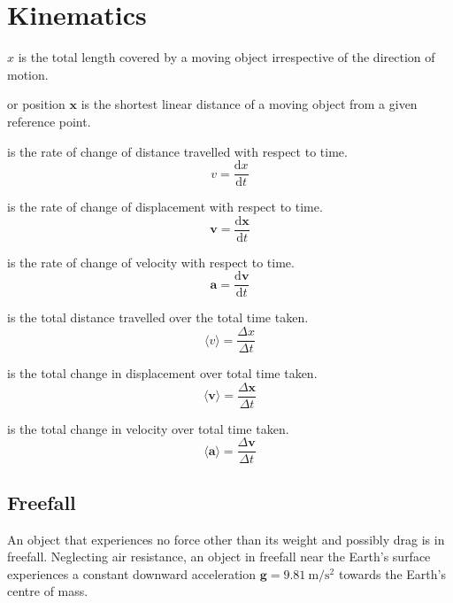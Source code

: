 \documentclass[Physics.tex]{subfiles}
\begin{document}
\chapter{Kinematics}
 \(x\) is the total length covered by a moving object irrespective of the direction of motion.

 or position \(\mathbf{x}\) is the shortest linear distance of a moving object from a given reference point.

 is the rate of change of distance travelled with respect to time. \begin{equation}v = \frac{\mathrm{d}x}{\mathrm{d}t}\end{equation} 

 is the rate of change of displacement with respect to time. \begin{equation}\mathbf{v} = \frac{\mathrm{d}\mathbf{x}}{\mathrm{d}t}\end{equation}

 is the rate of change of velocity with respect to time. \begin{equation}\mathbf{a} = \frac{\mathrm{d}\mathbf{v}}{\mathrm{d}t}\end{equation}

 is the total distance travelled over the total time taken. \begin{equation}\langle v \rangle = \frac{\Delta x}{\Delta t}\end{equation}

 is the total change in displacement over total time taken. \begin{equation}\langle\mathbf{v}\rangle = \frac{\Delta \mathbf{x}}{\Delta t}\end{equation}

 is the total change in velocity over total time taken. \begin{equation}\langle\mathbf{a}\rangle = \frac{\Delta \mathbf{v}}{\Delta t}\end{equation}
\section{Freefall}
An object that experiences no force other than its weight and possibly drag is in freefall. Neglecting air resistance, an object in freefall near the Earth's surface experiences a constant downward acceleration \(\mathbf{g} = \SI{9.81}{\metre\per\square\second}\) towards the Earth's centre of mass.
\end{document}
